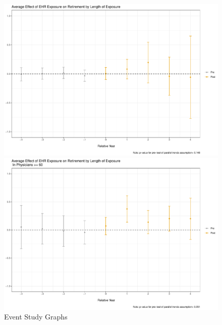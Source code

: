 \documentclass[11pt]{article}
\begin{document}
\begin{figure}[ht]
\caption{Event Study Graphs}
\vspace{2mm}
        \begin{minipage}[b]{0.47\linewidth}
            \centering
            \includegraphics[width=\textwidth]{Objects/ggdid_retire_allEHR.pdf}
        \end{minipage}
        \hspace{0.2cm}
        \begin{minipage}[b]{0.47\linewidth}
            \centering
            \includegraphics[width=\textwidth]{Objects/ggdid_retire_allEHR_old.pdf}
        \end{minipage}
        \label{fig:retirefirst}
\end{figure}
\end{document}

